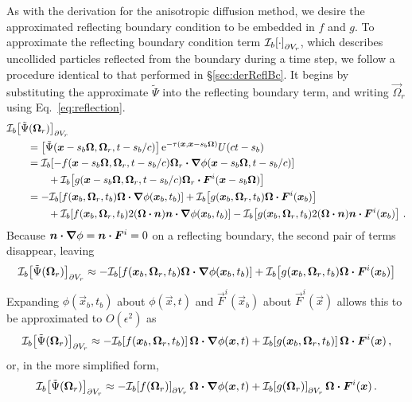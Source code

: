 As with the derivation for the anisotropic diffusion method, we desire the
approximated reflecting boundary condition to be embedded in $f$ and $g$. To
approximate the reflecting boundary condition term $\mathcal{I}_{b}\!\left[\cdot\right]_{\partial
V_r}$, which describes uncollided particles reflected from the boundary
during a time step, we follow a procedure identical to that performed in
\S\ref{sec:derReflBc}.  It begins by substituting the approximate $\tilde\Psi$
into the reflecting boundary term, and writing $\vec{\Omega}_r$ using
Eq.~\eqref{eq:reflection}. 
\begin{align*}
  \lefteqn{\lopinv{b}{\tilde\Psi(\vec{\Omega}_r)}_{\partial V_r}}\qquad&
  \\
  &= \left[\tilde\Psi(\vec{x} - s_b\vec{\Omega}, \vec{\Omega}_r, t - s_b/c)
  \right]
    \eexp^{ -\tau(\vec{x}, \vec{x} - s_b \vec{\Omega})}
    U(ct - s_b)
  \\
  &=\lopinv{b}{ - f(\vec{x} - s_b\vec{\Omega},\vec{\Omega}_r,t - s_b/c)
  \vec{\Omega}_r\vd \grad \phi(\vec{x} - s_b\vec{\Omega}, t - s_b/c)}
  \\
  &\qquad + \lopinv{b}{ g(\vec{x} - s_b\vec{\Omega}, \vec{\Omega}_r, t - s_b/c)
  \vec{\Omega}_r\vd \vec{F}^i(\vec{x} - s_b\vec{\Omega})}
  \\
  &= - \lopinv{b}{ f(\vec{x}_b,\vec{\Omega}_r,t_b)
  \vec{\Omega}\vd \grad \phi(\vec{x}_b, t_b)}
   + \lopinv{b}{ g(\vec{x}_b, \vec{\Omega}_r, t_b)
  \vec{\Omega}\vd \vec{F}^i(\vec{x}_b)}
  \\
  &\qquad + \lopinv{b}{ f(\vec{x}_b,\vec{\Omega}_r,t_b)
  2(\vec{\Omega} \vd \vec{n}) \vec{n} \vd \grad \phi(\vec{x}_b, t_b)}
   - \lopinv{b}{ g(\vec{x}_b, \vec{\Omega}_r, t_b)
  2(\vec{\Omega} \vd \vec{n}) \vec{n} \vd \vec{F}^i(\vec{x}_b)}\,.
\end{align*}
Because $\bm{n} \bm{\cdot} \bm{\nabla} \phi = \bm{n} \bm{\cdot} \bm{F}^i = 0$ on a
reflecting boundary, the second pair of terms disappear, leaving
\begin{equation*}
\mathcal{I}_{b}\!\left[\tilde\Psi(\bm{\Omega}_r)\right]_{\partial V_r}
  \approx - \mathcal{I}_{b}\!\left[ f(\bm{x}_b,\bm{\Omega}_r,t_b)
  \bm{\Omega}\bm{\cdot} \bm{\nabla} \phi(\bm{x}_b, t_b)\right]
   + \mathcal{I}_{b}\!\left[ g(\bm{x}_b, \bm{\Omega}_r, t_b)
  \bm{\Omega}\bm{\cdot} \bm{F}^i(\bm{x}_b)\right]
\end{equation*}
Expanding $\phi(\vec{x}_b, t_b)$ about $\phi(\vec{x}, t)$ and
$\vec{F}^i(\vec{x}_b)$ about $\vec{F}^i(\vec{x})$ allows this to be
approximated to $O(\epsilon^2)$ as
\begin{equation*}
  \mathcal{I}_{b}\!\left[\tilde\Psi(\bm{\Omega}_r)\right]_{\partial V_r}
  \approx
  - \mathcal{I}_{b}\!\left[ f(\bm{x}_b,\bm{\Omega}_r,t_b)\right] \bm{\Omega}\bm{\cdot} \bm{\nabla}
  \phi(\bm{x}, t)
  + \mathcal{I}_{b}\!\left[ g(\bm{x}_b, \bm{\Omega}_r, t_b)\right]
  \bm{\Omega}\bm{\cdot} \bm{F}^i(\bm{x})\,,
\end{equation*}
or, in the more simplified form,
\begin{equation} \label{eq:ap1reflApprox}
\mathcal{I}_{b}\!\left[\tilde\Psi(\bm{\Omega}_r)\right]_{\partial V_r}
\approx  
- \mathcal{I}_{b}\!\left[f(\bm{\Omega}_r)\right]_{\partial V_r}
\bm{\Omega} \bm{\cdot} \bm{\nabla} \phi(\bm{x}, t)
+ \mathcal{I}_{b}\!\left[g(\bm{\Omega}_r)\right]_{\partial V_r}
\bm{\Omega}\bm{\cdot} \bm{F}^i(\bm{x})
\,.
\end{equation}

